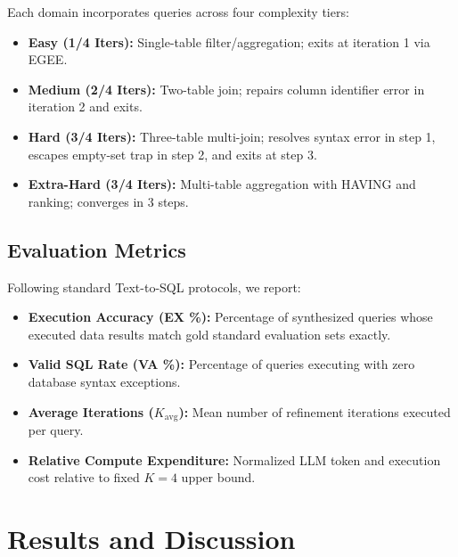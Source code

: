 \documentclass[conference]{IEEEtran}
\begin{document}
Each domain incorporates queries across four complexity tiers:
\begin{itemize}
    \item \textbf{Easy (1/4 Iters):} Single-table filter/aggregation; exits at iteration 1 via EGEE.
    \item \textbf{Medium (2/4 Iters):} Two-table join; repairs column identifier error in iteration 2 and exits.
    \item \textbf{Hard (3/4 Iters):} Three-table multi-join; resolves syntax error in step 1, escapes empty-set trap in step 2, and exits at step 3.
    \item \textbf{Extra-Hard (3/4 Iters):} Multi-table aggregation with HAVING and ranking; converges in 3 steps.
\end{itemize}

\subsection{Evaluation Metrics}
Following standard Text-to-SQL protocols, we report:
\begin{itemize}
    \item \textbf{Execution Accuracy (EX \%):} Percentage of synthesized queries whose executed data results match gold standard evaluation sets exactly.
    \item \textbf{Valid SQL Rate (VA \%):} Percentage of queries executing with zero database syntax exceptions.
    \item \textbf{Average Iterations ($K_{\text{avg}}$):} Mean number of refinement iterations executed per query.
    \item \textbf{Relative Compute Expenditure:} Normalized LLM token and execution cost relative to fixed $K=4$ upper bound.
\end{itemize}

\section{Results and Discussion}
\end{document}
